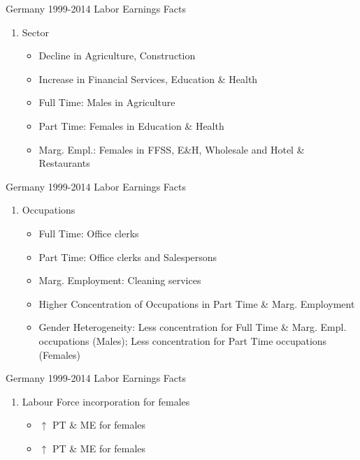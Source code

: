 \documentclass[hyperref={bookmarks=false}]{beamer}
\newcounter{ResumeEnumerate}
\begin{document}
\begin{frame}{Germany 1999-2014 Labor Earnings Facts}\label{DATA3}
\begin{enumerate}[start=\numexpr\value{ResumeEnumerate}+1]
\vfill
\item Sector \hyperlink{SECT}{}
\vfill
\begin{itemize}
\setlength{\itemsep}{0.7 cm}
\item Decline in Agriculture, Construction
\item Increase in Financial Services, Education \& Health
\item Full Time: Males in Agriculture
\item Part Time: Females in Education \& Health
\item Marg. Empl.: Females in FFSS, E\&H, Wholesale and Hotel \& Restaurants
\end{itemize}
\end{enumerate}
\setcounter{ResumeEnumerate}{\value{enumi}}
\end{frame}

\begin{frame}{Germany 1999-2014 Labor Earnings Facts}\label{DATA4}
\begin{enumerate}[start=\numexpr\value{ResumeEnumerate}+1]
\vfill
\item Occupations \hyperlink{OCCUP}{}
\vfill
\begin{itemize}
\setlength{\itemsep}{0.4 cm}
\item Full Time: Office clerks
\item Part Time: Office clerks and Salespersons
\item Marg. Employment: Cleaning services
\item Higher Concentration of Occupations in Part Time \& Marg. Employment
\item Gender Heterogeneity: Less concentration for Full Time \& Marg. Empl. occupations (Males); Less concentration for Part Time occupations (Females)
\end{itemize}
\end{enumerate}
\setcounter{ResumeEnumerate}{\value{enumi}}
\end{frame}

\begin{frame}{Germany 1999-2014 Labor Earnings Facts}\label{DATA5}
\begin{enumerate}[start=\numexpr\value{ResumeEnumerate}+1]
\vfill
\item Labour Force incorporation for females \hyperlink{LF}{}
\vfill
\begin{itemize}
\item $\uparrow$ PT \& ME for females \hyperlink{LTEIF}{}
\item $\uparrow$ PT \& ME for females \hyperlink{FEMHET}{}
\end{itemize}
\end{enumerate}
\end{frame}
\end{document}
